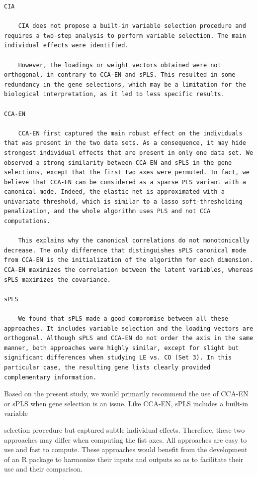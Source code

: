 \documentclass[
]{book}
\begin{document}
\begin{verbatim}
CIA

    CIA does not propose a built-in variable selection procedure and requires a two-step analysis to perform variable selection. The main individual effects were identified.

    However, the loadings or weight vectors obtained were not orthogonal, in contrary to CCA-EN and sPLS. This resulted in some redundancy in the gene selections, which may be a limitation for the biological interpretation, as it led to less specific results.

CCA-EN

    CCA-EN first captured the main robust effect on the individuals that was present in the two data sets. As a consequence, it may hide strongest individual effects that are present in only one data set. We observed a strong similarity between CCA-EN and sPLS in the gene selections, except that the first two axes were permuted. In fact, we believe that CCA-EN can be considered as a sparse PLS variant with a canonical mode. Indeed, the elastic net is approximated with a univariate threshold, which is similar to a lasso soft-thresholding penalization, and the whole algorithm uses PLS and not CCA computations.

    This explains why the canonical correlations do not monotonically decrease. The only difference that distinguishes sPLS canonical mode from CCA-EN is the initialization of the algorithm for each dimension. CCA-EN maximizes the correlation between the latent variables, whereas sPLS maximizes the covariance.

sPLS

    We found that sPLS made a good compromise between all these approaches. It includes variable selection and the loading vectors are orthogonal. Although sPLS and CCA-EN do not order the axis in the same manner, both approaches were highly similar, except for slight but significant differences when studying LE vs. CO (Set 3). In this particular case, the resulting gene lists clearly provided complementary information.
\end{verbatim}

Based on the present study, we would primarily recommend the use of CCA-EN or sPLS when gene selection is an issue. Like CCA-EN, sPLS includes a built-in variable

selection procedure but captured subtle individual effects. Therefore, these two approaches may differ when computing the fist axes. All approaches are easy to use and fast to compute. These approaches would benefit from the development of an R package to harmonize their inputs and outputs so as to facilitate their use and their comparison.
\end{document}
